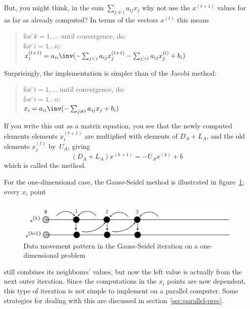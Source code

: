 But, you might think, in the sum $\sum_{j\not=i} a_{ij}x_j$ why
not use the $x^{(t+1)}$ values for as far as already computed?
In terms of the vectors $x^{(t)}$ this means
\begin{quote}
  \begin{tabbing}
    for \=$k=1,\ldots$ until convergence, do:\\
    \>for \=$i=1\ldots n$:\\
    \>\>$x^{(t+1)}_i = a_{ii}\inv (-\sum_{j<i} a_{ij}x_j^{(t+1)} -
                      \sum_{j>i} a_{ij}x_j^{(t)}+b_i)$\\
  \end{tabbing}
\end{quote}
Surprisingly, the implementation is simpler than of the Jacobi method:
\begin{quote}
  \begin{tabbing}
    for \=$t=1,\ldots$ until convergence, do:\\
    \>for \=$i=1\ldots n$:\\
    \>\>$x_i = a_{ii}\inv (-\sum_{j\not=i} a_{ij}x_j +b_i)$\\
  \end{tabbing}
\end{quote}
If you write this out as a matrix equation, you see that
the newly computed elements elements $x^{(t+1)}_i$ are 
multiplied with elements of $D_A+L_A$,
and the old elements $x^{(t)}_j$ by~$U_A$, giving
\[ (D_A+L_A)x^{(k+1)}=-U_Ax^{(k)}+b \]
which is called the  method.

For the one-dimensional case, the Gauss-Seidel method
is illustrated in figure~\ref{fig:1d-sor}; every $x_i$ point
\begin{figure}[ht]
  \includegraphics[scale=.08]{graphics/sor}
  \caption{Data movement pattern in the Gauss-Seidel iteration on a
    one-dimensional problem}
  \label{fig:1d-sor}
\end{figure}
still combines its neighbours' values, but now the left value is
actually from the next outer iteration. Since the computations in the
$x_i$ points are now dependent, this type of iteration is not simple
to implement on a parallel computer. Some strategies for dealing with
this are discussed in section~\ref{sec:parallel-prec}.

